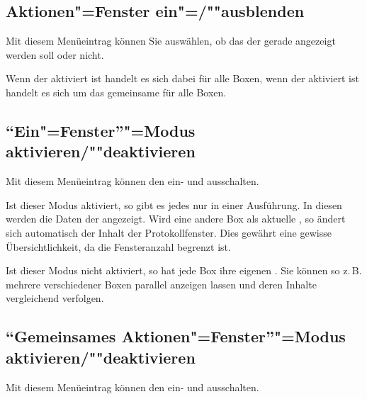 \subsection{Aktionen"=Fenster ein"=/""ausblenden}
\label{sec:MI_ACTION}

Mit diesem Menüeintrag können Sie auswählen, ob das
 der gerade
 angezeigt werden soll oder
nicht.


Wenn der  aktiviert 
ist handelt es sich dabei  für 
alle Boxen, wenn der 
aktiviert ist handelt es sich um das gemeinsame  
für alle Boxen.

\subsection{"`Ein"=Fenster"'"=Modus aktivieren/""deaktivieren}
\label{sec:MI_OWM}
Mit diesem Menüeintrag können den 
ein- und ausschalten.


Ist dieser Modus aktiviert, so gibt es jedes
 nur in einer
Ausführung. In diesen werden die Daten der
 angezeigt. Wird eine
andere Box als aktuelle , so
ändert sich automatisch der Inhalt der Protokollfenster. Dies gewährt
eine gewisse Übersichtlichkeit, da die Fensteranzahl begrenzt ist.


Ist dieser Modus nicht aktiviert, so hat jede Box ihre eigenen
. Sie können so z.\,B.
mehrere  verschiedener
Boxen parallel anzeigen lassen und deren Inhalte vergleichend
verfolgen.


\subsection{"`Gemeinsames Aktionen"=Fenster"'"=Modus aktivieren/""deaktivieren}
\label{sec:MI_CAW}
Mit diesem Menüeintrag können den  ein- und ausschalten.


